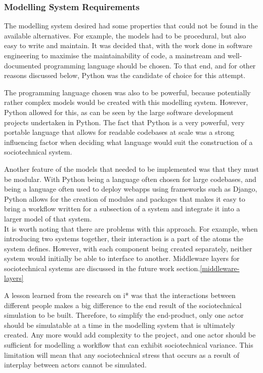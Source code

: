 \subsubsection{Modelling System Requirements}\label{planning_modelling_requirements}
The modelling system desired had some properties that could not be found in the available alternatives. For example, the models had to be procedural, but also easy to write and maintain. It was decided that, with the work done in software engineering to maximise the maintainability of code, a mainstream and well-documented programming language should be chosen. To that end, and for other reasons discussed below, Python was the candidate of choice for this attempt. \par
The programming language chosen was also to be powerful, because potentially rather complex models would be created with this modelling system. However, Python allowed for this, as can be seen by the large software development projects undertaken in Python. The fact that Python is a very powerful, very portable language that allows for readable codebases at scale was a strong influencing factor when deciding what language would suit the construction of a sociotechnical system. \par%
Another feature of the models that needed to be implemented was that they must be modular. With Python being a language often chosen for large codebases, and being a language often used to deploy webapps using frameworks such as Django\cite{Azzopardi2016a}, Python allows for the creation of modules and packages that makes it easy to bring a workflow written for a subsection of a system and integrate it into a larger model of that system. \\It is worth noting that there are problems with this approach. For example, when introducing two systems together, their interaction is a part of the atoms the system defines. However, with each component being created separately, neither system would initially be able to interface to another. Middleware layers for sociotechnical systems are discussed in the future work section.\cref{middleware-layers} \par%
A lesson learned from the research on i* was that the interactions between different people makes a big difference to the end result of the sociotechnical simulation to be built. Therefore, to simplify the end-product, only one actor should be simulatable at a time in the modelling system that is ultimately created. Any more would add complexity to the project, and one actor should be sufficient for modelling a workflow that can exhibit sociotechnical variance. This limitation will mean that any sociotechnical stress that occurs as a result of interplay between actors cannot be simulated. \par

